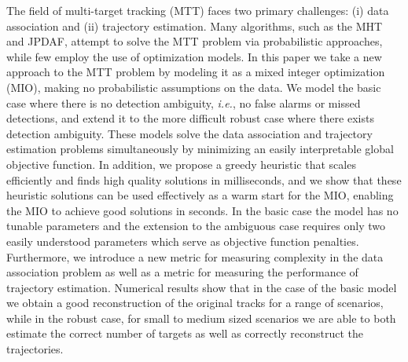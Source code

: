 The field of multi-target tracking (MTT) faces two primary challenges: (i) data association and (ii) trajectory estimation. Many algorithms, such as the MHT and JPDAF, attempt to solve the MTT problem via probabilistic approaches, while few employ the use of optimization models. In this paper we take a new approach to the MTT problem by modeling it as a mixed integer optimization (MIO), making no probabilistic assumptions on the data. We model the basic case where there is no detection ambiguity, \textit{i.e.}, no false alarms or missed detections, and extend it to the more difficult robust case where there exists detection ambiguity. These models solve the data association and trajectory estimation problems simultaneously by minimizing an easily interpretable global objective function. In addition, we propose a greedy heuristic that scales efficiently and finds high quality solutions in milliseconds, and we show that these heuristic solutions can be used effectively as a warm start for the MIO, enabling the MIO to achieve good solutions in seconds. In the basic case the model has no tunable parameters and the extension to the ambiguous case requires only two easily understood parameters which serve as objective function penalties. Furthermore, we introduce a new metric for measuring complexity in the data association problem as well as a metric for measuring the performance of trajectory estimation. Numerical results show that in the case of the basic model we obtain a good reconstruction of the original tracks for a range of scenarios, while in the robust case, for small to medium sized scenarios we are able to both estimate the correct number of targets as well as correctly reconstruct the trajectories.